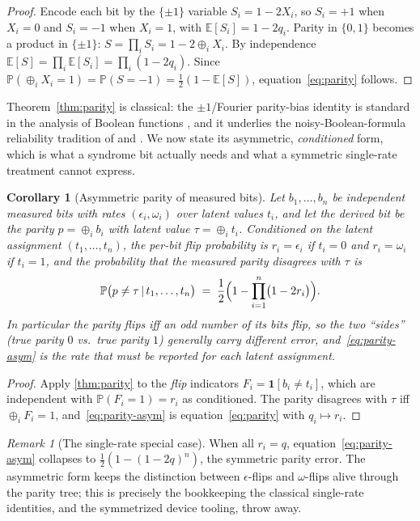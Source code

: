 \documentclass[a4paper,onecolumn,unpublished,nopdfoutputerror,allowtoday]{quantumarticle}
\numberwithin{equation}{section}
\theoremstyle{plain}
\newtheorem{corollary}[theorem]{Corollary}
\theoremstyle{definition}
\theoremstyle{remark}
\newtheorem{remark}[theorem]{Remark}
\newcommand{\eps}{\epsilon}
\newcommand{\Prob}{\mathbb{P}}
\newcommand{\Ind}[1]{\mathbf{1}\!\left[#1\right]}
\newcommand{\given}{\,\vert\,}
\newcommand{\bits}{\{0,1\}}
\newcommand{\bxor}{\oplus}
\begin{document}
\begin{proof}
Encode each bit by the $\{\pm1\}$ variable $S_i=1-2X_i$, so $S_i=+1$ when
$X_i=0$ and $S_i=-1$ when $X_i=1$, with $\mathbb{E}[S_i]=1-2q_i$. Parity in
$\bits$ becomes a product in $\{\pm1\}$: $S=\prod_i S_i = 1-2\bxor_i X_i$. By
independence $\mathbb{E}[S]=\prod_i\mathbb{E}[S_i]=\prod_i(1-2q_i)$. Since
$\Prob(\bxor_i X_i=1)=\Prob(S=-1)=\tfrac12(1-\mathbb{E}[S])$,
equation~\eqref{eq:parity} follows.
\end{proof}

Theorem~\ref{thm:parity} is classical: the $\pm1$/Fourier parity-bias identity is
standard in the analysis of Boolean functions \citep{odonnell2014}, and it
underlies the noisy-Boolean-formula reliability tradition of \citet{vonneumann1956}
and \citet{pippenger1988}. We now state its asymmetric,
\emph{conditioned} form, which is what a syndrome bit actually needs and what a
symmetric single-rate treatment cannot express.

\begin{corollary}[Asymmetric parity of measured bits]
\label{cor:parity-asym}
Let $b_1,\dots,b_n$ be independent measured bits with rates $(\eps_i,\omega_i)$
over latent values $t_i$, and let the derived bit be the parity
$p=\bxor_i b_i$ with latent value $\tau=\bxor_i t_i$. Conditioned on the latent
assignment $(t_1,\dots,t_n)$, the per-bit flip probability is $r_i=\eps_i$ if
$t_i=0$ and $r_i=\omega_i$ if $t_i=1$, and the probability that the measured
parity disagrees with $\tau$ is
\begin{equation}
\label{eq:parity-asym}
  \Prob\bigl(p \neq \tau \given t_1,\dots,t_n\bigr)
  \;=\; \frac12\Bigl(1 - \prod_{i=1}^{n}\bigl(1-2r_i\bigr)\Bigr).
\end{equation}
In particular the parity flips iff an \emph{odd} number of its bits flip, so the
two ``sides'' (true parity $0$ vs.\ true parity $1$) generally carry different
error, and~\eqref{eq:parity-asym} is the rate that must be reported for each
latent assignment.
\end{corollary}

\begin{proof}
Apply \cref{thm:parity} to the \emph{flip} indicators $F_i=\Ind{b_i\neq t_i}$,
which are independent with $\Prob(F_i=1)=r_i$ as conditioned. The parity disagrees
with $\tau$ iff $\bxor_i F_i=1$, and~\eqref{eq:parity-asym} is
equation~\eqref{eq:parity} with $q_i\mapsto r_i$.
\end{proof}

\begin{remark}[The single-rate special case]
When all $r_i=q$, equation~\eqref{eq:parity-asym} collapses to
$\tfrac12(1-(1-2q)^n)$, the symmetric parity error. The asymmetric form keeps the
distinction between $\eps$-flips and $\omega$-flips alive through the parity tree;
this is precisely the bookkeeping the classical single-rate identities, and the
symmetrized device tooling, throw away.
\end{remark}
\end{document}

